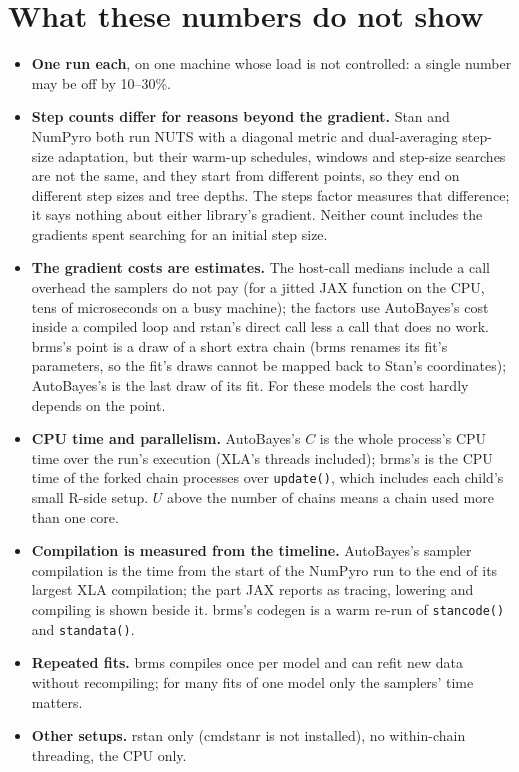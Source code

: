\documentclass[11pt]{article}
\newcommand{\code}[1]{\texttt{#1}}
\begin{document}
\section{What these numbers do not show}

\begin{itemize}
\item \textbf{One run each}, on one machine whose load is not controlled: a single number may be off by 10--30\%.
\item \textbf{Step counts differ for reasons beyond the gradient.} Stan and NumPyro both run NUTS with a diagonal metric
  and dual-averaging step-size adaptation, but their warm-up schedules, windows and step-size searches are not the same,
  and they start from different points, so they end on different step sizes and tree depths. The steps factor measures
  that difference; it says nothing about either library's gradient. Neither count includes the gradients spent searching
  for an initial step size.
\item \textbf{The gradient costs are estimates.} The host-call medians include a call overhead the samplers do not pay
  (for a jitted JAX function on the CPU, tens of microseconds on a busy machine); the factors use AutoBayes's cost inside
  a compiled loop and rstan's direct call less a call that does no work. brms's point is a draw of a short extra chain
  (brms renames its fit's parameters, so the fit's draws cannot be mapped back to Stan's coordinates); AutoBayes's is the
  last draw of its fit. For these models the cost hardly depends on the point.
\item \textbf{CPU time and parallelism.} AutoBayes's $C$ is the whole process's CPU time over the run's execution
  (XLA's threads included); brms's is the CPU time of the forked chain processes over \code{update()}, which includes
  each child's small R-side setup. $U$ above the number of chains means a chain used more than one core.
\item \textbf{Compilation is measured from the timeline.} AutoBayes's sampler compilation is the time from the start of
  the NumPyro run to the end of its largest XLA compilation; the part JAX reports as tracing, lowering and compiling is
  shown beside it. brms's codegen is a warm re-run of \code{stancode()} and \code{standata()}.
\item \textbf{Repeated fits.} brms compiles once per model and can refit new data without recompiling; for many fits of
  one model only the samplers' time matters.
\item \textbf{Other setups.} rstan only (cmdstanr is not installed), no within-chain threading, the CPU only.
\end{itemize}
\end{document}
